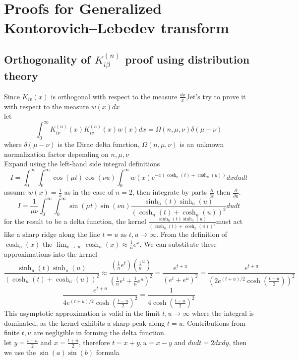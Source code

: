 \documentclass{article}
\newcommand{\NotDefinedsinh}[2]{\operatorname{\sinh_{#1}\text{#2}}}
\newcommand{\NotDefinedcosh}[2]{\operatorname{cosh}_{#1}\text{#2}}
\begin{document}
\section{Proofs for Generalized Kontorovich–Lebedev transform}
\subsection{Orthogonality of $K^{(n)}_{i\beta}$ proof using distribution theory}
Since $K_{iv}(x)$ is orthogonal with respect to the measure $\frac{dx}{x}$,let's try to prove it with respect to the measure $w(x)dx$\\
let
\[\int_{0}^{\infty}K^{(n)}_{i\nu}(x)K^{(n)}_{iv}(x)w(x)dx = \Omega(n,\mu,\nu)\delta(\mu-\nu)\]
where $\delta(\mu-\nu)$ is the Dirac delta function, $\Omega(n,\mu,\nu)$ is an unknown normalization factor depending on $n,\mu,\nu$\\
Expand using the left-hand side integral definitions
\[I=\int_{0}^{\infty}\int_{0}^{\infty}\cos(\mu t)\cos(\nu u) \int_{0}^{\infty}w(x)e^{-x(\NotDefinedcosh{n}{}(t)+\NotDefinedcosh{n}{}(u))}dxdudt\]
assume $w(x) = \frac{1}{x}$ as in the case of $n =2$, then integrate by parts $\frac{\partial}{\partial t}$ then $\frac{\partial}{\partial u}$.
\[I= \frac{1}{\mu\nu}\int_{0}^{\infty}\int_{0}^{\infty}\sin(\mu t)\sin(\nu u) \frac{\NotDefinedsinh{n}{}(t)\NotDefinedsinh{n}{}(u)}{(\NotDefinedcosh{n}{}(t)+\NotDefinedcosh{n}{}(u))^2}dudt\]
for the result to be a delta function, the kernel $\frac{\NotDefinedsinh{n}{}(t)\NotDefinedsinh{n}{}(u)}{(\NotDefinedcosh{n}{}(t)+\NotDefinedcosh{n}{}(u))^2}$must act like a sharp ridge along the line $t = u$ as $t, u \to \infty$. From the definition of $\NotDefinedcosh{n}{}(x)$ the $ \lim_{x\to \infty}\NotDefinedcosh{n}{}(x)\approx \frac{1}{n}e^{x}$,
We can substitute these approximations into the kernel
\[\frac{\NotDefinedsinh{n}{}(t)\NotDefinedsinh{n}{}(u)}{(\NotDefinedcosh{n}{}(t)+\NotDefinedcosh{n}{}(u))^2}\approx \frac{(\frac{1}{n}e^t)(\frac{1}{n}^u)}{(\frac{1}{n}e^{t}+\frac{1}{n}e^{u})^2} = \frac{e^{t+u}}{(e^{t}+e^{u})^2}=\frac{e^{t+u}}{(2 e^{(t+u)/2} \cosh(\frac{t-u}{2}))^2}\]
\[\frac{e^{t+u}}{4 e^{(t+u)/2} \cosh(\frac{t-u}{2})^2} = \frac{1}{4\cosh(\frac{t-u}{2})^2}\]
This asymptotic approximation is valid in the limit $t,u \to \infty$ where the integral is dominated, as the kernel exhibits a sharp peak along $t = u$. Contributions from finite $t,u$ are negligible in forming the delta function.\\
let $y = \frac{t-u}{2}$ and $x=\frac{t+u}{2}$, therefore $t= x+y,u=x-y$ and $dudt = 2dxdy$, then we use the $\sin(a)\sin(b)$ formula
\end{document}
